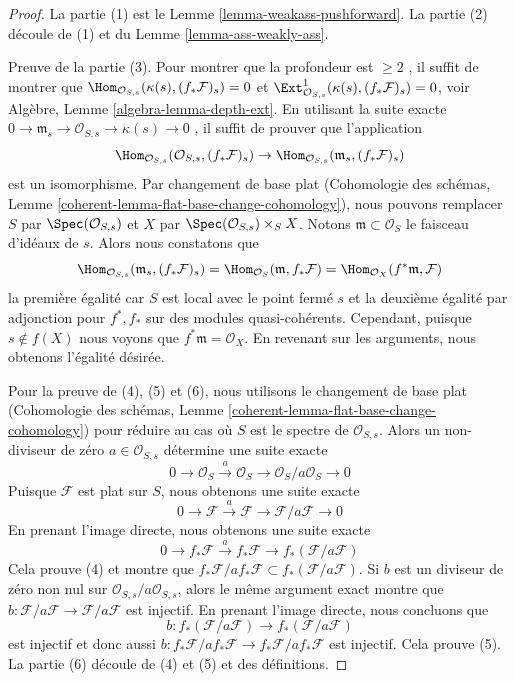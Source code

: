 \begin{proof}
La partie (1) est le Lemme  \ref{lemma-weakass-pushforward}. La partie (2) découle de (1) et du Lemme
 \ref{lemma-ass-weakly-ass}.

\medskip\noindent
Preuve de la partie (3). Pour montrer que la profondeur est  $\geq 2$ , il
suffit de montrer que  $\Hom_{\mathcal{O}_{S, s}}(\kappa(s), (f_*\mathcal{F})_s) = 0$  et  $\Ext^1_{\mathcal{O}_{S, s}}(\kappa(s), (f_*\mathcal{F})_s) = 0$, voir Algèbre, Lemme
 \ref{algebra-lemma-depth-ext}. En utilisant la suite exacte  $0 \to \mathfrak m_s \to \mathcal{O}_{S, s} \to \kappa(s) \to 0$ , il suffit de prouver que
l'application
$$
\Hom_{\mathcal{O}_{S, s}}(\mathcal{O}_{S, s}, (f_*\mathcal{F})_s)
\to
\Hom_{\mathcal{O}_{S, s}}(\mathfrak m_s, (f_*\mathcal{F})_s)
$$
est un isomorphisme. Par changement de base plat (Cohomologie des schémas, Lemme
 \ref{coherent-lemma-flat-base-change-cohomology}), nous pouvons remplacer  $S$  par  $\Spec(\mathcal{O}_{S, s})$  et
 $X$  par  $\Spec(\mathcal{O}_{S, s}) \times_S X$. Notons  $\mathfrak m \subset \mathcal{O}_S$  le faisceau d'idéaux de
 $s$. Alors nous constatons que
$$
\Hom_{\mathcal{O}_{S, s}}(\mathfrak m_s, (f_*\mathcal{F})_s) =
\Hom_{\mathcal{O}_S}(\mathfrak m, f_*\mathcal{F}) =
\Hom_{\mathcal{O}_X}(f^*\mathfrak m, \mathcal{F})
$$
la première égalité car  $S$  est local avec le point fermé  $s$  et
la deuxième égalité par adjonction pour  $f^*, f_*$  sur des modules
quasi-cohérents. Cependant, puisque  $s \not \in f(X)$  nous voyons que  $f^*\mathfrak m = \mathcal{O}_X$. En
revenant sur les arguments, nous obtenons l'égalité désirée.

\medskip\noindent
Pour la preuve de (4), (5) et (6), nous utilisons le changement de base plat
(Cohomologie des schémas, Lemme  \ref{coherent-lemma-flat-base-change-cohomology}) pour réduire au cas où  $S$ 
est le spectre de  $\mathcal{O}_{S, s}$. Alors un non-diviseur de zéro  $a \in \mathcal{O}_{S, s}$  détermine une
suite exacte
$$
0 \to \mathcal{O}_S \xrightarrow{a} \mathcal{O}_S \to
\mathcal{O}_S/a \mathcal{O}_S \to 0
$$
Puisque  $\mathcal{F}$  est plat sur  $S$, nous obtenons une suite exacte
$$
0 \to \mathcal{F} \xrightarrow{a} \mathcal{F} \to
\mathcal{F}/a\mathcal{F} \to 0
$$
En prenant l'image directe, nous obtenons une suite exacte
$$
0 \to f_*\mathcal{F} \xrightarrow{a} f_*\mathcal{F} \to
f_*(\mathcal{F}/a\mathcal{F})
$$
Cela prouve (4) et montre que  $f_*\mathcal{F}/ af_*\mathcal{F} \subset f_*(\mathcal{F}/a\mathcal{F})$. Si  $b$  est un diviseur de
zéro non nul sur  $\mathcal{O}_{S, s}/a\mathcal{O}_{S, s}$, alors le même argument exact montre que
 $b : \mathcal{F}/a\mathcal{F} \to \mathcal{F}/a\mathcal{F}$  est injectif. En prenant l'image directe, nous concluons que
$$
b : f_*(\mathcal{F}/a\mathcal{F}) \to f_*(\mathcal{F}/a\mathcal{F})
$$
est injectif et donc aussi  $b : f_*\mathcal{F}/ af_*\mathcal{F} \to f_*\mathcal{F}/ af_*\mathcal{F}$  est injectif. Cela prouve (5). La partie
(6) découle de (4) et (5) et des définitions.
\end{proof}











